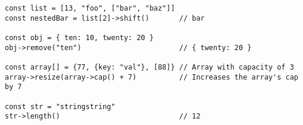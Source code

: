 \vspace{-2.25em}
\begin{center}
\begin{minipage}[t]{1\textwidth}
\begin{listing}[H]
\begin{spacing}{0.6}
\begin{verbatim}
const list = [13, "foo", ["bar", "baz"]]
const nestedBar = list[2]->shift()       // bar

const obj = { ten: 10, twenty: 20 }
obj->remove("ten")                       // { twenty: 20 }

const array[] = {77, {key: "val"}, [88]} // Array with capacity of 3
array->resize(array->cap() + 7)          // Increases the array's cap by 7

const str = "stringstring"
str->length()                            // 12
\end{verbatim}
\end{spacing}
\end{listing}
\end{minipage}
\end{center}

